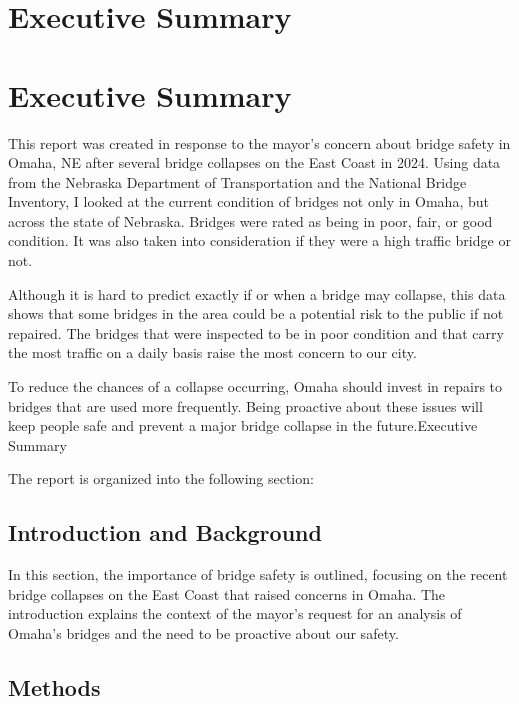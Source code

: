 \documentclass[
  letterpaper,
  DIV=11,
  numbers=noendperiod]{scrreprt}
\begin{document}

\chapter{Executive Summary}\label{executive-summary}


\chapter{Executive Summary}\label{executive-summary-1}

This report was created in response to the mayor's concern about bridge
safety in Omaha, NE after several bridge collapses on the East Coast in
2024. Using data from the Nebraska Department of Transportation and the
National Bridge Inventory, I looked at the current condition of bridges
not only in Omaha, but across the state of Nebraska. Bridges were rated
as being in poor, fair, or good condition. It was also taken into
consideration if they were a high traffic bridge or not.

Although it is hard to predict exactly if or when a bridge may collapse,
this data shows that some bridges in the area could be a potential risk
to the public if not repaired. The bridges that were inspected to be in
poor condition and that carry the most traffic on a daily basis raise
the most concern to our city.

To reduce the chances of a collapse occurring, Omaha should invest in
repairs to bridges that are used more frequently. Being proactive about
these issues will keep people safe and prevent a major bridge collapse
in the future.Executive Summary

The report is organized into the following section:

\section{Introduction and Background}\label{introduction-and-background}

In this section, the importance of bridge safety is outlined, focusing
on the recent bridge collapses on the East Coast that raised concerns in
Omaha. The introduction explains the context of the mayor's request for
an analysis of Omaha's bridges and the need to be proactive about our
safety.

\section{Methods}\label{methods}
\end{document}
